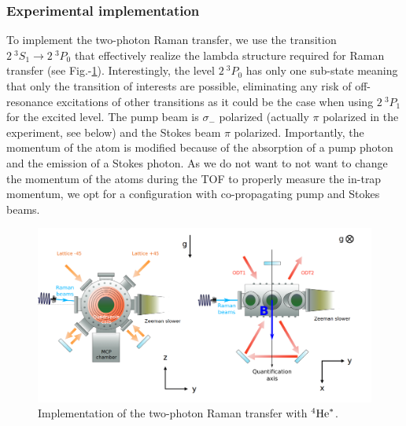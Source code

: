 \subsubsection{Experimental implementation}

To implement the two-photon Raman transfer, we use the transition $2 \ ^3 S_1 \rightarrow 2 \ ^3 P_0$ that effectively realize the lambda structure required for Raman transfer (see Fig.-\ref{fig:raman_He}). Interestingly, the level $2 \ ^3 P_0$ has only one sub-state meaning that only the transition of interests are possible, eliminating any risk of off-resonance excitations of other transitions as it could be the case when using $2 \ ^3 P_1$ for the excited level. The pump beam is $\sigma_-$ polarized (actually $\pi$ polarized in the experiment, see below) and the Stokes beam $\pi$ polarized. Importantly, the momentum of the atom is modified because of the absorption of a pump photon and the emission of a Stokes photon. As we do not want to not want to change the momentum of the atoms during the TOF to properly measure the in-trap momentum, we opt for a configuration with co-propagating pump and Stokes beams.

\begin{figure}
    \centering
    \includegraphics[width=\textwidth]{Fig/Chapter3/raman_sc.png}
    \caption{Implementation of the two-photon Raman transfer with $^4 \rm{He}^*$.}
    \label{fig:raman_He}
\end{figure}

